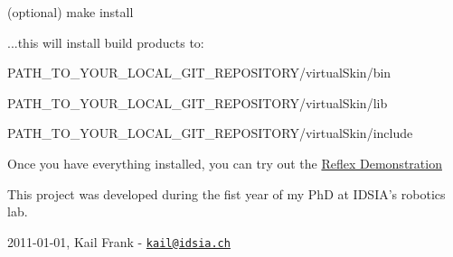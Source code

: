 \begin{DoxyEnumerate}
\begin{DoxyItemize}
\item \begin{DoxyVerb}(optional) make install \end{DoxyVerb}
 ...this will install build products to:
\begin{DoxyItemize}
\item PATH\_\-TO\_\-YOUR\_\-LOCAL\_\-GIT\_\-REPOSITORY/virtualSkin/bin
\item PATH\_\-TO\_\-YOUR\_\-LOCAL\_\-GIT\_\-REPOSITORY/virtualSkin/lib
\item PATH\_\-TO\_\-YOUR\_\-LOCAL\_\-GIT\_\-REPOSITORY/virtualSkin/include
\end{DoxyItemize}
\end{DoxyItemize}
\end{DoxyEnumerate}Once you have everything installed, you can try out the \hyperlink{reflex_demo}{Reflex Demonstration}

This project was developed during the fist year of my PhD at IDSIA's robotics lab.

2011-\/01-\/01, Kail Frank -\/ \href{mailto:kail@idsia.ch}{\tt kail@idsia.ch} 